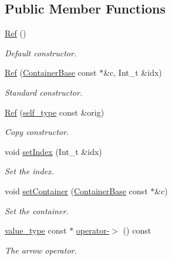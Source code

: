 \subsection*{Public Member Functions}
\begin{DoxyCompactItemize}
\item 
\hyperlink{classpanda_1_1Ref_aa9280ff78ab44076b90831fa6d5ee05a}{Ref} ()
\begin{DoxyCompactList}\small\item\em Default constructor. \item\end{DoxyCompactList}\item 
\hyperlink{classpanda_1_1Ref_ac19a2c6f6de8291120811a2438e1f05b}{Ref} (\hyperlink{classpanda_1_1ContainerBase}{ContainerBase} const $\ast$\&c, Int\_\-t \&idx)
\begin{DoxyCompactList}\small\item\em Standard constructor. \item\end{DoxyCompactList}\item 
\hyperlink{classpanda_1_1Ref_ac7c585423cd52662fbd774186661024e}{Ref} (\hyperlink{classpanda_1_1Ref}{self\_\-type} const \&orig)
\begin{DoxyCompactList}\small\item\em Copy constructor. \item\end{DoxyCompactList}\item 
void \hyperlink{classpanda_1_1Ref_ad310725ff2b08e1f83e40fa21599894a}{setIndex} (Int\_\-t \&idx)
\begin{DoxyCompactList}\small\item\em Set the index. \item\end{DoxyCompactList}\item 
void \hyperlink{classpanda_1_1Ref_a8e17556e348a48fe243aee93f714ba80}{setContainer} (\hyperlink{classpanda_1_1ContainerBase}{ContainerBase} const $\ast$\&c)
\begin{DoxyCompactList}\small\item\em Set the container. \item\end{DoxyCompactList}\item 
\hyperlink{classpanda_1_1Ref_a52b7615b884eb959c20ef4fd8f23ded0}{value\_\-type} const $\ast$ \hyperlink{classpanda_1_1Ref_a5545faf85a2d31f3edf3fd2205ba1e40}{operator-\/$>$} () const 
\begin{DoxyCompactList}\small\item\em The arrow operator. \item\end{DoxyCompactList}\item 

\end{DoxyCompactItemize}
